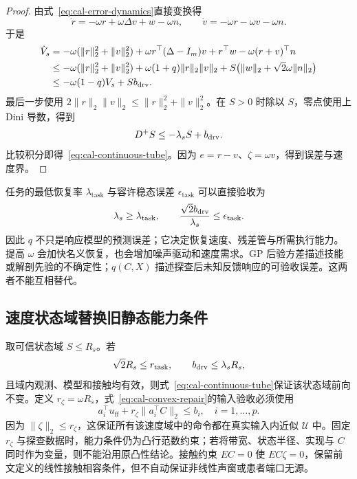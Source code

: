 \documentclass[11pt,a4paper]{article}
\numberwithin{equation}{section}
\theoremstyle{definition}
\begin{document}
\begin{proof}
由式~\eqref{eq:cal-error-dynamics}直接变换得
\begin{equation}
 \dot r=-\omega r+\omega\Delta v+w-\omega n,
 \qquad
 \dot v=-\omega r-\omega v-\omega n.
 \label{eq:cal-servo-rv}
\end{equation}
于是
\begin{align}
 \dot V_s
 &=-\omega(\|r\|_2^2+\|v\|_2^2)
   +\omega r^\top(\Delta-I_m)v
   +r^\top w-\omega(r+v)^\top n\\
 &\le-\omega(\|r\|_2^2+\|v\|_2^2)
   +\omega(1+q)\|r\|_2\|v\|_2
   +S\bigl(\|w\|_2+\sqrt2\omega\|n\|_2\bigr)\\
 &\le-\omega(1-q)V_s+Sb_{\rm drv}.
 \label{eq:cal-servo-lyapunov}
\end{align}
最后一步使用 $2\|r\|_2\|v\|_2\le\|r\|_2^2+\|v\|_2^2$。在 $S>0$ 时除以 $S$，零点使用上 Dini 导数，得到
\begin{equation}
 D^+S\le-\lambda_sS+b_{\rm drv}.
\end{equation}
比较积分即得~\eqref{eq:cal-continuous-tube}。因为 $e=r-v$、$\zeta=\omega v$，得到误差与速度界。
\end{proof}

任务的最低恢复率 $\lambda_{\mathrm{task}}$ 与容许稳态误差 $\epsilon_{\mathrm{task}}$ 可以直接验收为
\begin{equation}
 \lambda_s\ge\lambda_{\mathrm{task}},\qquad
 \frac{\sqrt2b_{\rm drv}}{\lambda_s}\le\epsilon_{\mathrm{task}}.
 \label{eq:cal-task-rate}
\end{equation}
因此 $q$ 不只是响应模型的预测误差；它决定恢复速度、残差管与所需执行能力。提高 $\omega$ 会加快名义恢复，也会增加噪声驱动和速度需求。GP 后验方差描述技能或解剖先验的不确定性；$q(C,X)$ 描述探查后未知反馈响应的可验收误差。这两者不能互相替代。

\subsection{速度状态域替换旧静态能力条件}

取可信状态域 $S\le R_s$。若
\begin{equation}
 \sqrt2R_s\le r_{\mathrm{task}},\qquad
 b_{\rm drv}\le\lambda_sR_s,
 \label{eq:cal-servo-invariant}
\end{equation}
且域内观测、模型和接触均有效，则式~\eqref{eq:cal-continuous-tube}保证该状态域前向不变。定义 $r_\zeta=\omega R_s$，式~\eqref{eq:cal-convex-repair}的输入验收必须使用
\begin{equation}
 \boxed{a_i^\top u_{\mathrm{ff}}
       +r_\zeta\|a_i^\top C\|_2\le b_i,
       \quad i=1,\ldots,p.}
 \label{eq:cal-servo-capability}
\end{equation}
因为 $\|\zeta\|_2\le r_\zeta$，这保证所有该速度域中的命令都在真实输入内近似 $\mathcal U$ 中。固定 $r_\zeta$ 与探查数据时，能力条件仍为凸行范数约束；若将带宽、状态半径、实现与 $C$ 同时作为变量，则不能沿用原凸性结论。接触约束 $EC=0$ 使 $EC\zeta=0$，保留前文定义的线性接触相容条件，但不自动保证非线性声窗或患者端口无源。
\end{document}
